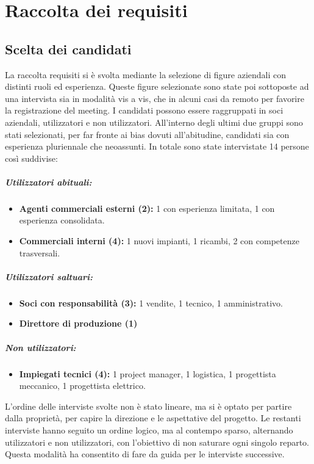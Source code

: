 \chapter{Raccolta dei requisiti}\label{chapter:Raccolta Requisiti}
\section{Scelta dei candidati}
La raccolta requisiti si è svolta mediante la selezione di figure aziendali con distinti ruoli ed esperienza.
Queste figure selezionate sono state poi sottoposte ad una intervista sia in modalità vis a vis,
che in alcuni casi da remoto per favorire la registrazione del meeting.
I candidati possono essere raggruppati in soci aziendali, utilizzatori e non utilizzatori.
All'interno degli ultimi due gruppi sono stati selezionati, per far fronte ai bias dovuti all'abitudine,
candidati sia con esperienza pluriennale che neoassunti.
In totale sono state intervistate 14 persone così suddivise:
\paragraph{Utilizzatori abituali:}
\begin{itemize}
    \item \textbf{Agenti commerciali esterni (2):} 1 con esperienza limitata, 1 con esperienza consolidata.
    \item \textbf{Commerciali interni (4):} 1 nuovi impianti, 1 ricambi, 2 con competenze trasversali.
\end{itemize}

\paragraph{Utilizzatori saltuari:}
\begin{itemize}
    \item \textbf{Soci con responsabilità (3):} 1 vendite, 1 tecnico, 1 amministrativo.
    \item \textbf{Direttore di produzione (1)}
\end{itemize}

\paragraph{Non utilizzatori:}
\begin{itemize}
    \item \textbf{Impiegati tecnici (4):} 1 project manager, 1 logistica, 1 progettista meccanico, 1 progettista elettrico.
\end{itemize}
L'ordine delle interviste svolte non è stato lineare, ma si è optato per partire
dalla proprietà, per capire la direzione e le aspettative del progetto.
Le restanti interviste hanno seguito un ordine logico, ma al contempo sparso, alternando utilizzatori e non utilizzatori,
con l'obiettivo di non saturare ogni singolo reparto.
Questa modalità ha consentito di fare da guida per le interviste successive.

